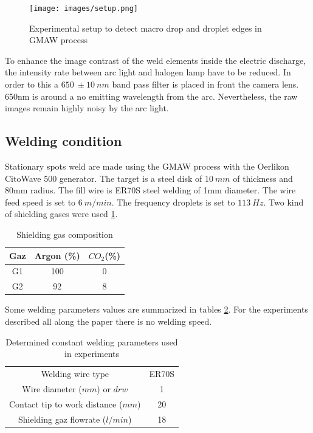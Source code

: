 \documentclass[12pt]{iopart}
\begin{document}
\begin{figure}
\begin{center}
\texttt{[image: images/setup.png]}
\caption{{\small Experimental setup to detect macro drop and droplet edges in GMAW process}}
\label{schema-montage-experimental-GMAW}
\end{center}
\end{figure}

To enhance the image contrast of the weld elements inside the electric discharge,
the intensity rate between arc light and halogen lamp have to be reduced. In order to this
a $650\ \pm 10\ nm$ band pass filter is placed in front the camera lens. 650nm
is around a no emitting wavelength from the arc. Nevertheless, the raw images remain highly 
noisy by the arc light. 


\subsection{ Welding condition}
\label{ welding_conditions}

Stationary spots weld are made using the GMAW process with the Oerlikon CitoWave 500 generator. 
The target is a steel disk of $10\ mm$ of thickness and 80mm radius.
The fill wire is ER70S steel welding of 1mm diameter.
The  wire feed speed is set to $6\ m/min$. The frequency droplets is set to $113\ Hz$. 
Two kind of  shielding gases were used \ref{tab::gases}. 
\begin{table}[h]
\centering
\begin{tabular}{|c|c|c|}
\hline
Gaz & Argon (\%) & $CO_2$(\%) \\ \hline
G1 & 100       & 0 \\ \hline
G2 & 92        & 8 \\ \hline
\end{tabular}
\caption{Shielding gas composition}\label{tab::gases}
\end{table}

Some welding parameters values are summarized in tables \ref{table-parameters-static}.
For the experiments described all along the paper there is no welding speed.

\begin{table}
\begin{center}
\begin{tabular}{|cc|}
\hline
Welding wire type & ER70S \\ 
Wire diameter ($mm$) or $drw$ & 1 \\  
Contact tip to work distance ($mm$) & 20 \\
Shielding gaz flowrate ($l/min$) & 18 \\ \hline
\end{tabular}
\caption{{\small Determined constant welding parameters used in experiments}}
\label{table-parameters-static}
\end{center}
\end{table}
\end{document}

